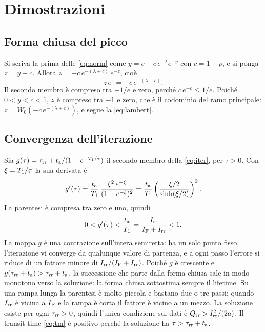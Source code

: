 \documentclass[10pt,a4paper]{scrartcl}
\let\newcommand\pdvaluedefine
\newcommand{\IF}{I_\mathrm{F}}
\newcommand{\Irr}{I_\mathrm{rr}}
\newcommand{\Qrr}{Q_\mathrm{rr}}
\newcommand{\ta}{t_\mathrm{a}}
\newcommand{\taurr}{\tau_\mathrm{rr}}
\newcommand{\Tone}{T_1}
\begin{document}
\section{Dimostrazioni}
\label{app:proofs}
\subsection{Forma chiusa del picco}
\label{app:lambert}
Si scriva la prima delle \eqref{eq:norm} come $y = c - c\,e^{-\lambda}e^{-y}$ con $c = 1-\rho$, e si ponga $z = y - c$. Allora $z = -c\,e^{-(\lambda+c)}\,e^{-z}$, cioè
\begin{equation}
z\,e^{z} = -c\,e^{-(\lambda+c)} .
\end{equation}
Il secondo membro è compreso tra $-1/e$ e zero, perché $c\,e^{-c} \leq 1/e$. Poiché $0 < y < c < 1$, $z$ è compreso tra $-1$ e zero, che è il codominio del ramo principale: $z = W_0(-c\,e^{-(\lambda+c)})$, e segue la \eqref{eq:lambert}.

\subsection{Convergenza dell'iterazione}
\label{app:contraction}
Sia $g(\tau) = \taurr + \ta/(1-e^{-\Tone/\tau})$ il secondo membro della \eqref{eq:iter}, per $\tau > 0$. Con $\xi = \Tone/\tau$ la sua derivata è
\begin{equation}
g'(\tau) = \frac{\ta}{\Tone}\,\frac{\xi^2\,e^{-\xi}}{(1-e^{-\xi})^2} = \frac{\ta}{\Tone}\left(\frac{\xi/2}{\sinh(\xi/2)}\right)^{2} .
\end{equation}
La parentesi è compresa tra zero e uno, quindi
\begin{equation}
0 < g'(\tau) < \frac{\ta}{\Tone} = \frac{\Irr}{\IF+\Irr} < 1 .
\end{equation}
La mappa $g$ è una contrazione sull'intera semiretta: ha un solo punto fisso, l'iterazione vi converge da qualunque valore di partenza, e a ogni passo l'errore si riduce di un fattore minore di $\Irr/(\IF+\Irr)$. Poiché $g$ è crescente e $g(\taurr+\ta) > \taurr+\ta$, la successione che parte dalla forma chiusa sale in modo monotono verso la soluzione: la forma chiusa sottostima sempre il lifetime. Su una rampa lunga la parentesi è molto piccola e bastano due o tre passi; quando $\Irr$ è vicina a $\IF$ e la rampa è corta il fattore è vicino a un mezzo. La soluzione esiste per ogni $\taurr > 0$, quindi l'unica condizione sui dati è $\Qrr > \Irr^2/(2a)$. Il transit time \eqref{eq:tm} è positivo perché la soluzione ha $\tau > \taurr + \ta$.
\end{document}
